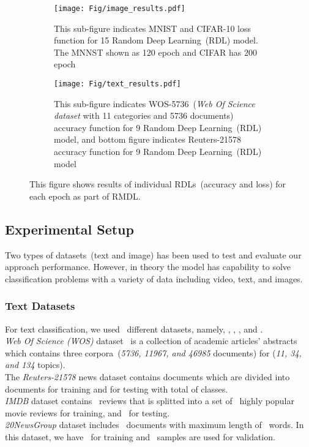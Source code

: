 \documentclass[sigconf, final]{acmart}
\begin{document}
\begin{figure*}[htbp]
    \centering
    \begin{subfigure}[t]{0.479\textwidth}
        \texttt{[image: Fig/image\_results.pdf]}
        \caption{This sub-figure indicates MNIST and CIFAR-10 loss function for 15 Random Deep Learning~(RDL) model. The MNNST shown as 120 epoch and CIFAR has 200 epoch}\label{fig:image_loss}
    \end{subfigure}
  \hfill
    \begin{subfigure}[t]{0.5\textwidth}
        \texttt{[image: Fig/text\_results.pdf]}
        \caption{This sub-figure indicates WOS-5736~(\textit{Web Of Science dataset} with 11 categories and 5736 documents) accuracy function for 9 Random Deep Learning~(RDL) model, and bottom figure indicates Reuters-21578 accuracy function for 9 Random Deep Learning~(RDL) model}
        \label{fig:text_accuracy}
    \end{subfigure}
    \caption{This figure shows results of individual RDLs~(accuracy and loss) for each epoch as part of RMDL.}
    \label{fig:results}
 
\end{figure*}



\subsection{Experimental Setup} 
Two types of datasets~(text and image) has been used to test and evaluate our approach performance. However, in theory the model has capability to solve classification problems with a variety of data including video, text, and images.  
\subsubsection{Text Datasets}
For text classification, we used~ different datasets, namely,  , , , and .\\ \textit{Web Of Science (WOS)} dataset~\cite{kowsari2018WOS} is a collection of academic articles' abstracts which contains three corpora~(\textit{5736, 11967, and 46985 }documents) for (\textit{11, 34, and 134} topics).\\ The \textit{Reuters-21578}  news dataset contains  documents which are divided into  documents for training and  for testing with total of  classes.\\
\textit{IMDB} dataset contains~ reviews that is splitted into a set of~ highly popular movie reviews for training, and~ for testing.\\
\textit{20NewsGroup} dataset includes~ documents with maximum length of~ words. In this dataset, we have~ for training and~ samples are used for validation.
\end{document}
